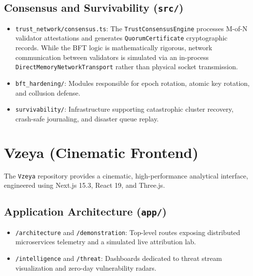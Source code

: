 \subsection{Consensus and Survivability (\texttt{src/})}
\begin{itemize}
    \item \texttt{trust\_network/consensus.ts}: The \texttt{TrustConsensusEngine} processes M-of-N validator attestations and generates \texttt{QuorumCertificate} cryptographic records. While the BFT logic is mathematically rigorous, network communication between validators is simulated via an in-process \texttt{DirectMemoryNetworkTransport} rather than physical socket transmission.
    \item \texttt{bft\_hardening/}: Modules responsible for epoch rotation, atomic key rotation, and collusion defense.
    \item \texttt{survivability/}: Infrastructure supporting catastrophic cluster recovery, crash-safe journaling, and disaster queue replay.
\end{itemize}

\section{Vzeya (Cinematic Frontend)}
\label{app:project_inventory:vzeya}

The \texttt{Vzeya} repository provides a cinematic, high-performance analytical interface, engineered using Next.js 15.3, React 19, and Three.js.

\subsection{Application Architecture (\texttt{app/})}
\begin{itemize}
    \item \texttt{/architecture} and \texttt{/demonstration}: Top-level routes exposing distributed microservices telemetry and a simulated live attribution lab.
    \item \texttt{/intelligence} and \texttt{/threat}: Dashboards dedicated to threat stream visualization and zero-day vulnerability radars.
\end{itemize}

